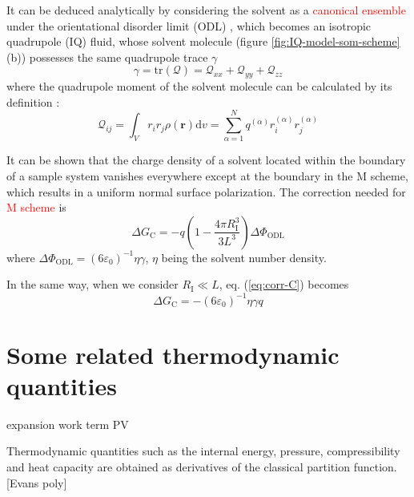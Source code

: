 It can be deduced analytically by considering the solvent as a \textcolor{red}{canonical
ensemble} under the orientational disorder limit (ODL) \citep{Kastenholz_2006_I},
which becomes an isotropic quadrupole (IQ) fluid, whose solvent molecule
(figure \ref{fig:IQ-model-som-scheme} (b)) possesses the same quadrupole
trace $\gamma$ 
\begin{equation}
\gamma=\mathrm{tr}(\mathbf{\mathcal{Q}})=\mathcal{Q}_{xx}+\mathcal{Q}_{yy}+\mathcal{Q}_{zz}
\end{equation}
where the quadrupole moment of the solvent molecule can be calculated
by its definition \citep{Multipole}:
\begin{equation}
\mathcal{Q}_{ij}=\int_{V}r_{i}r_{j}\rho(\mathbf{r})\mathrm{d}v=\sum_{\alpha=1}^{N}q^{(\alpha)}r_{i}^{(\alpha)}r_{j}^{(\alpha)}
\end{equation}


It can be shown that the charge density of a solvent located within the
boundary of a sample system vanishes everywhere except at the boundary
in the M scheme, which results in a uniform normal surface polarization.
The correction needed for\textcolor{red}{{} M scheme }is
\begin{equation}
\Delta G_{\mathrm{C}}=-q\left(1-\frac{4\pi R_{\mathrm{I}}^{3}}{3L^{3}}\right)\Delta\Phi_{\mathrm{ODL}}\label{eq:corr-C}
\end{equation}
where $\Delta\Phi_{\mathrm{ODL}}=\left(6\varepsilon_{0}\right)^{-1}\eta\gamma$,
$\eta$ being the solvent number density.

In the same way, when we consider $R_{\mathrm{I}}\ll L$, eq. (\ref{eq:corr-C})
becomes
\begin{equation}
\Delta G_{\mathrm{C}}=-\left(6\varepsilon_{0}\right)^{-1}\eta\gamma q
\end{equation}



\section{Some related thermodynamic quantities}

\textquotedbl{}expansion work\textquotedbl{} term PV

Thermodynamic quantities such as the internal energy, pressure, compressibility
and heat capacity are obtained as derivatives of the classical partition
function. {[}Evans poly{]}

